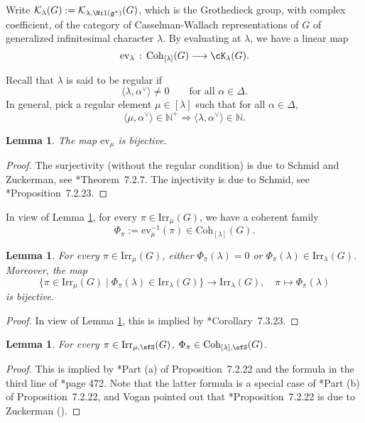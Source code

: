 \documentclass[12pt,a4paper]{amsart}
\newcommand{\BN}{{\mathbb {N}}}
\newcommand{\CK}{{\mathcal {K}}}
\newcommand{\g}{\mathfrak g}
\newcommand{\la}{\langle}
\newcommand{\ra}{\rangle}
\numberwithin{equation}{section}
\newtheorem{lem}[thm]{Lemma}
\theoremstyle{remark}
\def\Irr{\mathrm{Irr}}
\def\Coh{\mathrm{Coh}}
\newcommand{\Grt}{\cK}
\begin{document}
Write $\CK_{\lambda}(G):=  \CK_{\lambda,\Nil(\g^*)}(G)$, which is the Grothedieck group, with complex coefficient, of the category of Casselman-Wallach representations of $G$ of generalized infinitesimal character $\lambda$.
By evaluating at $\lambda$, we have  a linear map
   \[
    \mathrm{ev}_{\lambda } \, :\,  \Coh_{[\lambda]}(G) \longrightarrow \Grt_{\lambda}(G).
  \]


Recall that $\lambda$ is said to be regular if
\[
    \la \lambda, \alpha^\vee\ra\neq 0 \qquad\textrm{for all $\alpha\in \Delta$}.
  \]
In general, pick a regular  element $\mu\in [\lambda]$ such that for all $\alpha\in \Delta$,
    \[
    \la \mu, \alpha^\vee\ra\in \BN^+ \Rightarrow  \la \lambda, \alpha^\vee\ra\in \BN.
  \]



 \begin{lem}\label{lem21}
The map  $\mathrm{ev}_{\mu}$ is bijective.
     \end{lem}
\begin{proof}
The surjectivity (without the regular condition) is due to Schmid and Zuckerman, see  \cite{Vg}*{Theorem~7.2.7}. The injectivity  is due to Schmid, see \cite{Vg}*{Proposition~7.2.23}.

\end{proof}




In view of Lemma \ref{lem21}, for every $\pi\in \Irr_{\mu}(G)$, we have a coherent family
\[
\Phi_\pi:=\mathrm{ev}_{\mu}^{-1}(\pi)\in  \Coh_{[\lambda]}(G).
\]

\begin{lem}\label{lemirr}
For every $\pi\in \Irr_{\mu}(G)$,  either  $\Phi_{\pi}(\lambda)=0$ or
         $\Phi_{\pi}(\lambda)\in \Irr_{\lambda}(G)$. Moreover, the map
         \[
           \{\pi\in \Irr_{\mu}(G)\mid \Phi_{\pi}(\lambda)\in \Irr_{\lambda}(G)\}\rightarrow \Irr_\lambda(G), \quad \pi\mapsto \Phi_{\pi}(\lambda)
         \]
         is bijective.
         \end{lem}
\begin{proof}
In view  of Lemma \ref{lem21}, this is implied by  \cite{Vg}*{Corollary~7.3.23}.
\end{proof}


\begin{lem}\label{lemirr11}
For every $\pi\in \Irr_{\mu, \sfS}(G)$,  $\Phi_{\pi}\in \Coh_{[\lambda],\sfS}(G)$.
         \end{lem}
\begin{proof}
This is implied by \cite{Vg}*{Part (a) of Proposition~7.2.22}  and the formula in the third line of  \cite{Vg}*{page 472}. Note that the latter  formula  is a special case of  \cite{Vg}*{Part (b) of Proposition~7.2.22}, and Vogan pointed out that \cite{Vg}*{Proposition~7.2.22} is due to Zuckerman (\cite{Zu}).

\end{proof}
\end{document}
